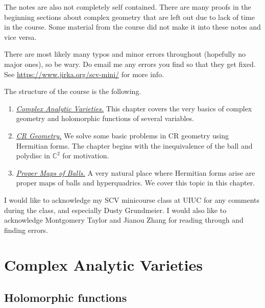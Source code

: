 \documentclass[12pt,openany]{book}
\newcommand{\C}{{\mathbb{C}}}
\theoremstyle{plain}
\theoremstyle{remark}
\theoremstyle{definition}
\theoremstyle{exercise}
\theoremstyle{example}
\begin{document}
The notes are also not completely self contained.  There are many proofs
in the beginning sections about complex geometry that are left
out due to lack of time in the course.  Some material from the course did not
make it into these notes and vice versa.

There are most likely many typos and minor errors throughout (hopefully no
major ones), so be wary.  Do email me any errors you find so that they get
fixed.
See \url{https://www.jirka.org/scv-mini/} for more info.

The structure of the course is the following.

\begin{enumerate}
\item \emph{\hyperref[cav:chapter]{Complex Analytic Varieties.}}  This chapter covers the very
basics of complex geometry and holomorphic functions of several variables.
\item \emph{\hyperref[cr:chapter]{CR Geometry.}}  We solve some basic problems in CR geometry using
Hermitian forms.  The chapter begins with the inequivalence of the ball and
polydisc in $\C^2$ for motivation.
\item \emph{\hyperref[proper:chapter]{Proper Maps of Balls.}}  A very natural place where Hermitian
forms arise are proper maps of balls and hyperquadrics.  We cover this topic
in this chapter.
\end{enumerate}

I would like to acknowledge my SCV minicourse class at UIUC for any comments
during the class, and especially Dusty Grundmeier.  I would also like to
acknowledge Montgomery Taylor and Jianou Zhang for reading through and finding errors.


\chapter{Complex Analytic Varieties} \label{cav:chapter}


\section{Holomorphic functions} \label{sec:holfunc}
\end{document}
